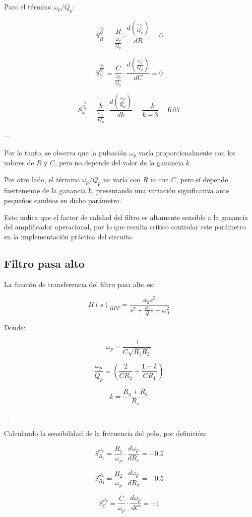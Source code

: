 \documentclass[12pt,a4paper]{article}
\begin{document}
Para el término \( \omega_p / Q_p \):

\[
S_R^{\frac{\omega_p}{Q_p}} =
\frac{R}{\frac{\omega_p}{Q_p}} \cdot
\frac{d\left(\frac{\omega_p}{Q_p}\right)}{dR}
= 0
\]

\[
S_C^{\frac{\omega_p}{Q_p}} =
\frac{C}{\frac{\omega_p}{Q_p}} \cdot
\frac{d\left(\frac{\omega_p}{Q_p}\right)}{dC}
= 0
\]

\[
S_k^{\frac{\omega_p}{Q_p}} =
\frac{k}{\frac{\omega_p}{Q_p}} \cdot
\frac{d\left(\frac{\omega_p}{Q_p}\right)}{dk}
=
\frac{-k}{k - 3} = 6.67
\]

---

Por lo tanto, se observa que la pulsación \( \omega_p \) varía proporcionalmente con los valores de \(R\) y \(C\), pero no depende del valor de la ganancia \(k\).

Por otro lado, el término \( \omega_p / Q_p \) no varía con \(R\) ni con \(C\), pero sí depende fuertemente de la ganancia \(k\), presentando una variación significativa ante pequeños cambios en dicho parámetro.

Esto indica que el factor de calidad del filtro es altamente sensible a la ganancia del amplificador operacional, por lo que resulta crítico controlar este parámetro en la implementación práctica del circuito.


\subsection{Filtro pasa alto}

La función de transferencia del filtro pasa alto es:

\[
H(s)_{HPF} = \frac{a_2 s^2}{s^2 + \frac{\omega_0}{Q}s + \omega_0^2}
\]

Donde:

\[
\omega_p = \frac{1}{C\sqrt{R_1 R_2}}
\]

\[
\frac{\omega_p}{Q_p} =
\left(\frac{2}{C R_2} + \frac{1-k}{C R_1}\right)
\]

\[
k = \frac{R_a + R_b}{R_a}
\]

---

Calculando la sensibilidad de la frecuencia del polo, por definición:

\[
S_{R_1}^{\omega_p} =
\frac{R_1}{\omega_p} \cdot \frac{d\omega_p}{dR_1}
= -0.5
\]

\[
S_{R_2}^{\omega_p} =
\frac{R_2}{\omega_p} \cdot \frac{d\omega_p}{dR_2}
= -0.5
\]

\[
S_C^{\omega_p} =
\frac{C}{\omega_p} \cdot \frac{d\omega_p}{dC}
= -1
\]
\end{document}
